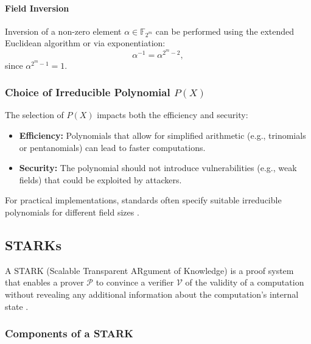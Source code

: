 \documentclass{article}
\theoremstyle{plain}
\theoremstyle{definition}
\theoremstyle{remark}
\theoremstyle{problem}
\begin{document}
\paragraph{Field Inversion}
Inversion of a non-zero element $\alpha \in \mathbb{F}_{2^m}$ can be performed using the extended Euclidean algorithm or via exponentiation:
\[
\alpha^{-1} = \alpha^{2^m - 2},
\]
since $\alpha^{2^m - 1} = 1$.

\subsubsection{Choice of Irreducible Polynomial $P(X)$}

The selection of $P(X)$ impacts both the efficiency and security:
\begin{itemize}
    \item \textbf{Efficiency:} Polynomials that allow for simplified arithmetic (e.g., trinomials or pentanomials) can lead to faster computations.
    \item \textbf{Security:} The polynomial should not introduce vulnerabilities (e.g., weak fields) that could be exploited by attackers.
\end{itemize}

For practical implementations, standards often specify suitable irreducible polynomials for different field sizes \cite{nist-recomm}.

\subsection{STARKs}

A STARK (Scalable Transparent ARgument of Knowledge) is a proof system that enables a prover $\mathcal{P}$ to convince a verifier $\mathcal{V}$ of the validity of a computation without revealing any additional information about the computation's internal state \cite{ben2018scalable}.

\subsubsection{Components of a STARK}
\end{document}
